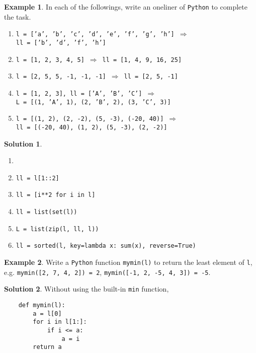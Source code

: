 \documentclass[11pt]{extarticle}
\newcommand{\ie}{\,\Longrightarrow\,}
\theoremstyle{definition}
\newtheorem*{ex}{Example}
\newtheorem*{sol}{Solution}
\begin{document}
\newpage

\begin{ex}
  In each of the followings, write an oneliner of {\tt Python} to complete the task. 
  \begin{enumerate}\setlength{\itemsep}{-4pt}
    \item {\tt l = ['a', 'b', 'c', 'd', 'e', 'f', 'g', 'h']} $\ie$ \\ {\tt ll = ['b', 'd', 'f', 'h']}
    \item {\tt l = [1, 2, 3, 4, 5]} $\ie$ {\tt ll = [1, 4, 9, 16, 25]}
    \item {\tt l = [2, 5, 5, -1, -1, -1]} $\ie$ {\tt ll = [2, 5, -1]}
    \item {\tt l = [1, 2, 3], ll = ['A', 'B', 'C']} $\ie$ \\{\tt L = [(1, 'A', 1), (2, 'B', 2), (3, 'C', 3)]}
    \item {\tt l = [(1, 2), (2, -2), (5, -3), (-20, 40)]} $\ie$ \\ {\tt ll = [(-20, 40), (1, 2), (5, -3), (2, -2)]}
  \end{enumerate}
\end{ex}
 
\begin{sol}
  \begin{enumerate}[label=(\alph*)]\setlength{\itemsep}{-4pt}
    \item[]
    \item {\tt ll = l[1::2]}
    \item {\tt ll = [i**2 for i in l]}
    \item {\tt ll = list(set(l))}
    \item {\tt L = list(zip(l, ll, l))}
    \item {\tt ll = sorted(l, key=lambda x: sum(x), reverse=True)}
  \end{enumerate}
\end{sol}

\newpage

\begin{ex} 
  Write a {\tt Python} function {\tt mymin(l)} to return the least element of {\tt l}, e.g. {\tt mymin([2, 7, 4, 2]) = 2}, {\tt mymin([-1, 2, -5, 4, 3]) = -5}.
\end{ex}

\begin{sol} Without using the built-in {\tt min} function, \\
  \begin{verbatim}
    def mymin(l):
        a = l[0]
        for i in l[1:]:
            if i <= a:
                a = i
        return a
  \end{verbatim}
\end{sol}
\end{document}

